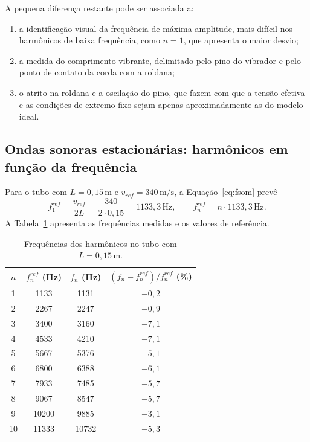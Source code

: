 \documentclass[12pt, a4paper]{article}
\newcommand{\un}[1]{\,\mathrm{#1}}
\newcommand{\fonte}[1]{\par\vspace{2pt}{\footnotesize Fonte: #1}}
\begin{document}
A pequena diferença restante pode ser associada a:
\begin{enumerate}
    \item a identificação visual da frequência de máxima amplitude, mais difícil nos harmônicos de baixa frequência, como $n=1$, que apresenta o maior desvio;
    \item a medida do comprimento vibrante, delimitado pelo pino do vibrador e pelo ponto de contato da corda com a roldana;
    \item o atrito na roldana e a oscilação do pino, que fazem com que a tensão efetiva e as condições de extremo fixo sejam apenas aproximadamente as do modelo ideal.
\end{enumerate}

\subsection{Ondas sonoras estacionárias: harmônicos em função da frequência}

Para o tubo com $L=0{,}15\un{m}$ e $v_{ref}=340\un{m/s}$, a Equação~\eqref{eq:fsom} prevê
\[
f_1^{ref}=\frac{v_{ref}}{2L}=\frac{340}{2\cdot0{,}15}=1133{,}3\un{Hz},
\qquad
f_n^{ref}=n\cdot1133{,}3\un{Hz}.
\]
A Tabela~\ref{tab:som_f} apresenta as frequências medidas e os valores de referência.

\begin{table}[H]
\centering
\caption{Frequências dos harmônicos no tubo com $L=0{,}15\un{m}$.}
\label{tab:som_f}
\begin{tabular}{cccc}
\toprule
$n$ & $f_n^{ref}$ (Hz) & $f_n$ (Hz) & $(f_n-f_n^{ref})/f_n^{ref}$ (\%) \\
\midrule
1 & 1133 & 1131 & $-0{,}2$ \\
2 & 2267 & 2247 & $-0{,}9$ \\
3 & 3400 & 3160 & $-7{,}1$ \\
4 & 4533 & 4210 & $-7{,}1$ \\
5 & 5667 & 5376 & $-5{,}1$ \\
6 & 6800 & 6388 & $-6{,}1$ \\
7 & 7933 & 7485 & $-5{,}7$ \\
8 & 9067 & 8547 & $-5{,}7$ \\
9 & 10200 & 9885 & $-3{,}1$ \\
10 & 11333 & 10732 & $-5{,}3$ \\
\bottomrule
\end{tabular}
\fonte{Elaborada pelos autores.}
\end{table}
\end{document}

